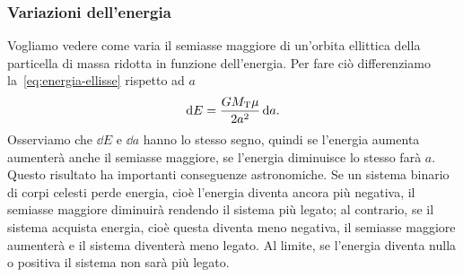 {\subsubsection{Variazioni dell'energia}
\label{sec:variazioni energia}

Vogliamo vedere come varia il semiasse maggiore di un'orbita ellittica della
particella di massa ridotta in funzione dell'energia. Per fare ciò differenziamo
la~\eqref{eq:energia-ellisse} rispetto ad $a$
\begin{equation}
  \mathop{}\!\mathrm{d} E = \frac{GM_\textup{T}\mu}{2a^2}\mathop{}\!\mathrm{d} a.
\end{equation}
Osserviamo che $\dd E$ e $\dd a$ hanno lo stesso segno, quindi se l'energia
aumenta aumenterà anche il semiasse maggiore, se l'energia diminuisce lo stesso
farà $a$. Questo risultato ha importanti conseguenze astronomiche. Se un sistema
binario di corpi celesti perde energia, cioè l'energia diventa ancora più
negativa, il semiasse maggiore diminuirà rendendo il sistema più legato; al
contrario, se il sistema acquista energia, cioè questa diventa meno negativa, il
semiasse maggiore aumenterà e il sistema diventerà meno legato. Al limite, se
l'energia diventa nulla o positiva il sistema non sarà più legato.

}
